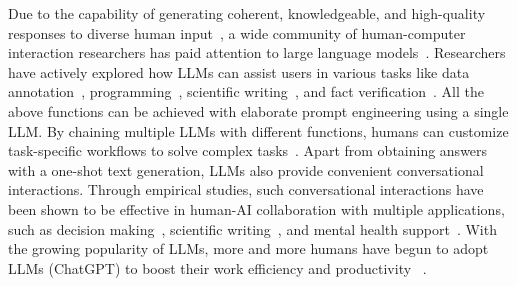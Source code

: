 Due to the capability of generating coherent, knowledgeable, and high-quality responses to diverse human input~\cite{wei2022emergent}, a wide community of human-computer interaction researchers has paid attention to large language models~\cite{liao2023ai}.
Researchers have actively explored how LLMs can assist users in various tasks like data annotation~\cite{wang2024human,he2024if}, programming~\cite{omidvar2024evaluating}, scientific writing~\cite{shen2023convxai}, and fact verification~\cite{si2024large}. 
All the above functions can be achieved with elaborate prompt engineering using a single LLM. 
By chaining multiple LLMs with different functions, humans can customize task-specific workflows to solve complex tasks~\cite{wu2022ai}. 
Apart from obtaining answers with a one-shot text generation, LLMs also provide convenient conversational interactions. 
Through empirical studies, such conversational interactions have been shown to be effective in human-AI collaboration with multiple applications, such as decision making~\cite{slack2023explaining,lin2024decision,ma2024towards}, scientific writing~\cite{shen2023convxai}, and mental health support~\cite{sharma2023human}. 
With the growing popularity of LLMs, more and more humans have begun to adopt LLMs (\eg ChatGPT) to boost their work efficiency and productivity %
~\cite{zhao2023survey}.



